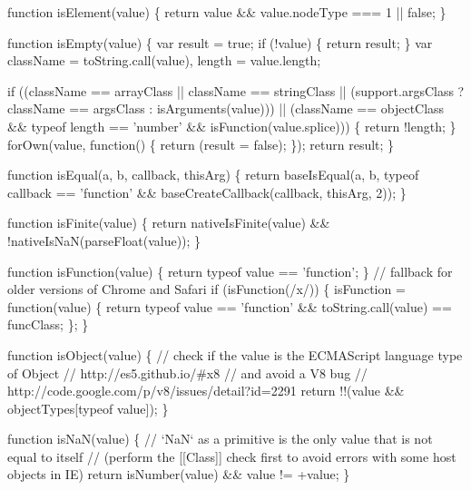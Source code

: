 \begin{DoxyCodeInclude}
    \textcolor{keyword}{function} isElement(value) \{
      \textcolor{keywordflow}{return} value && value.nodeType === 1 || \textcolor{keyword}{false};
    \}

    \textcolor{keyword}{function} isEmpty(value) \{
      var result = \textcolor{keyword}{true};
      \textcolor{keywordflow}{if} (!value) \{
        \textcolor{keywordflow}{return} result;
      \}
      var className = toString.call(value),
          length = value.length;

      \textcolor{keywordflow}{if} ((className == arrayClass || className == stringClass ||
          (support.argsClass ? className == argsClass : isArguments(value))) ||
          (className == objectClass && typeof length == \textcolor{stringliteral}{'number'} && isFunction(value.splice))) \{
        \textcolor{keywordflow}{return} !length;
      \}
      forOwn(value, \textcolor{keyword}{function}() \{
        \textcolor{keywordflow}{return} (result = \textcolor{keyword}{false});
      \});
      \textcolor{keywordflow}{return} result;
    \}

    \textcolor{keyword}{function} isEqual(a, b, callback, thisArg) \{
      \textcolor{keywordflow}{return} baseIsEqual(a, b, typeof callback == \textcolor{stringliteral}{'function'} && baseCreateCallback(callback, thisArg, 2));
    \}

    \textcolor{keyword}{function} isFinite(value) \{
      \textcolor{keywordflow}{return} nativeIsFinite(value) && !nativeIsNaN(parseFloat(value));
    \}

    \textcolor{keyword}{function} isFunction(value) \{
      \textcolor{keywordflow}{return} typeof value == \textcolor{stringliteral}{'function'};
    \}
    \textcolor{comment}{// fallback for older versions of Chrome and Safari}
    \textcolor{keywordflow}{if} (isFunction(/x/)) \{
      isFunction = \textcolor{keyword}{function}(value) \{
        \textcolor{keywordflow}{return} typeof value == \textcolor{stringliteral}{'function'} && toString.call(value) == funcClass;
      \};
    \}

    \textcolor{keyword}{function} isObject(value) \{
      \textcolor{comment}{// check if the value is the ECMAScript language type of Object}
      \textcolor{comment}{// http://es5.github.io/#x8}
      \textcolor{comment}{// and avoid a V8 bug}
      \textcolor{comment}{// http://code.google.com/p/v8/issues/detail?id=2291}
      \textcolor{keywordflow}{return} !!(value && objectTypes[typeof value]);
    \}

    \textcolor{keyword}{function} isNaN(value) \{
      \textcolor{comment}{// `NaN` as a primitive is the only value that is not equal to itself}
      \textcolor{comment}{// (perform the [[Class]] check first to avoid errors with some host objects in IE)}
      \textcolor{keywordflow}{return} isNumber(value) && value != +value;
    \}


\end{DoxyCodeInclude}
